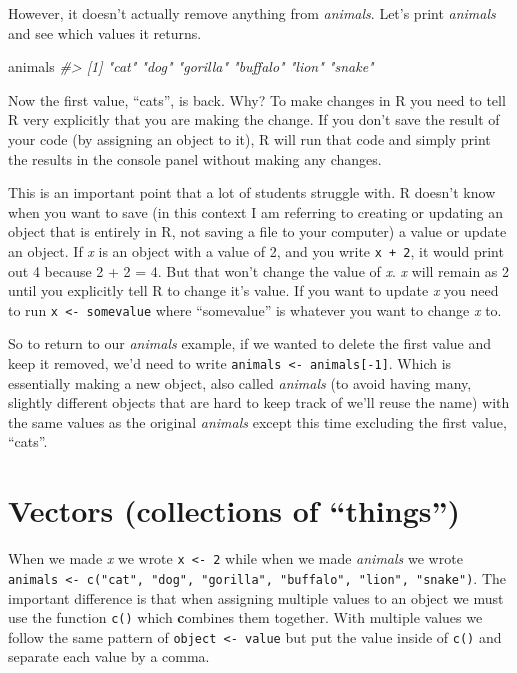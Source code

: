 \documentclass[
  12pt,
]{book}
\newenvironment{Shaded}{\begin{snugshade}}{\end{snugshade}}
\newcommand{\CommentTok}[1]{\textcolor[rgb]{0.37,0.37,0.37}{\textit{#1}}}
\newcommand{\NormalTok}[1]{#1}
\begin{document}
However, it doesn't actually remove anything from \emph{animals}. Let's print \emph{animals} and see which values it returns.

\begin{Shaded}
\begin{Highlighting}[]
\NormalTok{animals}
\CommentTok{\#> [1] "cat"     "dog"     "gorilla" "buffalo" "lion"    "snake"}
\end{Highlighting}
\end{Shaded}

Now the first value, ``cats'', is back. Why? To make changes in R you need to tell R very explicitly that you are making the change. If you don't save the result of your code (by assigning an object to it), R will run that code and simply print the results in the console panel without making any changes.

This is an important point that a lot of students struggle with. R doesn't know when you want to save (in this context I am referring to creating or updating an object that is entirely in R, not saving a file to your computer) a value or update an object. If \emph{x} is an object with a value of 2, and you write \texttt{x\ +\ 2}, it would print out 4 because 2 + 2 = 4. But that won't change the value of \emph{x}. \emph{x} will remain as 2 until you explicitly tell R to change it's value. If you want to update \emph{x} you need to run \texttt{x\ \textless{}-\ somevalue} where ``somevalue'' is whatever you want to change \emph{x} to.

So to return to our \emph{animals} example, if we wanted to delete the first value and keep it removed, we'd need to write \texttt{animals\ \textless{}-\ animals{[}-1{]}}. Which is essentially making a new object, also called \emph{animals} (to avoid having many, slightly different objects that are hard to keep track of we'll reuse the name) with the same values as the original \emph{animals} except this time excluding the first value, ``cats''.

\hypertarget{vectors}{%
\section{Vectors (collections of ``things'')}\label{vectors}}

When we made \emph{x} we wrote \texttt{x\ \textless{}-\ 2} while when we made \emph{animals} we wrote \texttt{animals\ \textless{}-\ c("cat",\ "dog",\ "gorilla",\ "buffalo",\ "lion",\ "snake")}. The important difference is that when assigning multiple values to an object we must use the function \texttt{c()} which \textbf{c}ombines them together. With multiple values we follow the same pattern of \texttt{object\ \textless{}-\ value} but put the value inside of \texttt{c()} and separate each value by a comma.
\end{document}
